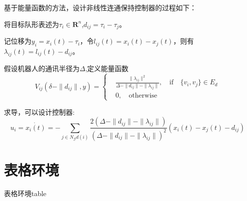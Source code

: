 \documentclass[12pt]{ctexart}
\begin{document}
基于能量函数的方法，设计非线性连通保持控制器的过程如下：

将目标队形表述为$\tau_i \in \boldsymbol{R}^n$,$d_{ij} = \tau_i - \tau_j$。

记位移为$y_i = x_i(t) - \tau_i$，令$l_{ij}(t) = x_i(t)-x_j(t)$，则有$\lambda_{ij}(t) = l_{ij}(t) - d_{ij}$。

假设机器人的通讯半径为$\Delta$,定义能量函数
\begin{equation*}
    V_{ij}(\delta - \|d_{ij}\|,y) =
        \begin{cases}
        &\frac{\|\lambda_{ij}\|^2}{\Delta - \|d_{ij}\| - \|\lambda_{ij}\|}, \quad \text{if} \quad \{v_i,v_j\} \in E_d\\
        &0, \quad \text{otherwise}
        \end{cases}
\end{equation*}

求导，可以\textcolor{cherry}{设计控制器}:
\begin{equation*}
    u_i = \dot{x_i(t)} = -\sum_{j \in N_\mathcal{G}d(i)} \frac{
        2(\Delta - \|d_{ij}\| - \|\lambda_{ij}\|)}{(\Delta - \|d_{ij}\| - \|\lambda_{ij}\|)^2}(x_i(t) - x_j(t)-d_{ij})
\end{equation*}

\newpage
\section{表格环境}
表格环境{table}
\end{document}
